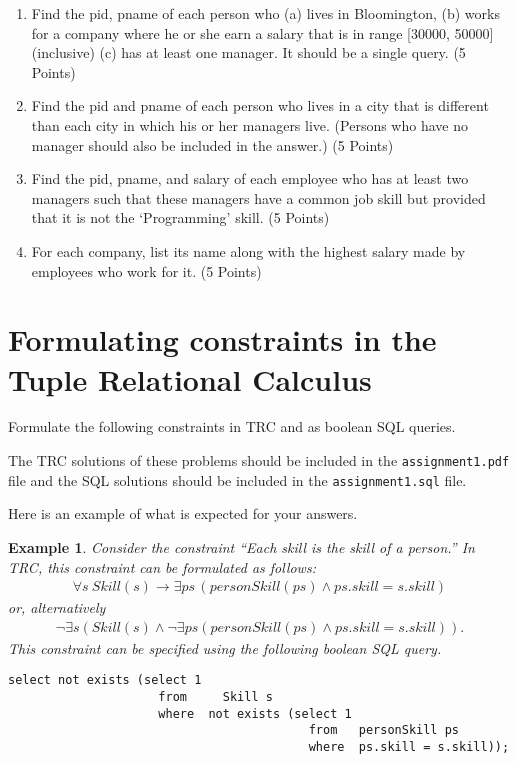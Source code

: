 \documentclass{article}
\newtheorem{example}{Example}
\begin{document}
\begin{enumerate}[resume]
\item Find the pid, pname of each person who (a) lives in Bloomington, (b) works for a company where he or she earn a salary that is
in range [30000, 50000] (inclusive) (c) has at least one manager. It should be a single query. (5 Points)

\item Find the pid and pname of each person who lives in a city
that is different than each city in which his or her managers live. (Persons
who have no manager should also be included in the answer.) (5 Points)

\item Find the pid, pname, and salary of each employee who has
at least two managers such that these managers have a common job skill
but provided that it is not the `Programming' skill. (5 Points)

\item For each company, list its name along with the highest salary
made by employees who work for it. (5 Points)

\end{enumerate}
\newpage

\section{Formulating constraints in the Tuple Relational Calculus}

Formulate the following constraints in TRC and as boolean SQL queries.    

The TRC solutions of these problems should be included in the {\tt assignment1.pdf} file and
the SQL solutions should be included in the {\tt assignment1.sql} file.

Here is an example of what is expected for your answers.

\begin{example}
Consider the constraint ``\emph{Each skill is the skill of a person.}''
In TRC, this constraint can be formulated as follows:
$$
\begin{array}{l}
\forall s\ Skill(s) \rightarrow \exists ps\, (personSkill(ps) \land ps.skill = s.skill)
\end{array}
$$
or, alternatively
$$
\begin{array}{l}
\lnot \exists s (Skill(s) \land \lnot \exists ps (personSkill(ps) \land ps.skill = s.skill)).
\end{array}
$$
This constraint can be specified using the following boolean SQL query.
\begin{verbatim}
select not exists (select 1
      	      	     from	  Skill	s
      	      	     where  not exists (select 1
      	      	      	      	          from   personSkill ps
      	      	      	      	          where  ps.skill = s.skill));
\end{verbatim}

\end{example}
\end{document}
